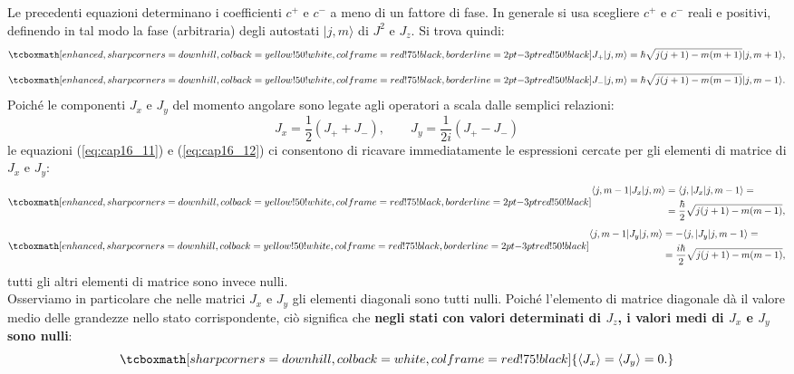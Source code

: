 \documentclass[a4paper,12pt,oneside]{book}
\begin{document}
Le precedenti equazioni determinano i coefficienti $c^+$ e $c^-$ a meno di un fattore di fase. In generale si usa scegliere $c^+$ e $c^-$ reali e positivi, definendo in tal modo la fase (arbitraria) degli autostati $\vert j,m \rangle$ di $J^2$ e $J_z$. Si trova quindi:
	\begin{equation}
		\tcboxmath[enhanced, sharp corners=downhill, colback=yellow!50!white, colframe=red!75!black, borderline={2pt}{-3pt}{red!50!black}]{
 			J_+\vert j, m \rangle =\hbar \sqrt{j(j+1)-m(m+1)}\vert j, m+1 \rangle ,
 			}
	\label{eq:cap16_11}
	\end{equation}
	\begin{equation}
		\tcboxmath[enhanced, sharp corners=downhill, colback=yellow!50!white, colframe=red!75!black, borderline={2pt}{-3pt}{red!50!black}]{
			J_-\vert j, m \rangle =\hbar \sqrt{j(j+1)-m(m-1)}\vert j, m-1 \rangle  .
			}
	\label{eq:cap16_12}
	\end{equation}
Poiché le componenti $J_x$ e $J_y$ del momento angolare sono legate agli operatori a scala dalle semplici relazioni:
\begin{equation}
J_x= \frac{1}{2}\left(J_+ + J_-\right),\qquad J_y= \frac{1}{2i}\left(J_+ - J_-\right)
\end{equation}
le equazioni (\ref{eq:cap16_11}) e (\ref{eq:cap16_12}) ci consentono di ricavare immediatamente le espressioni cercate per gli elementi di matrice di $J_x$ e $J_y$:
	\begin{equation}
		\tcboxmath[enhanced, sharp corners=downhill, colback=yellow!50!white, colframe=red!75!black, borderline={2pt}{-3pt}{red!50!black}]{
		\begin{aligned}
			\langle j, m-1\vert J_x\vert j, m \rangle &=\langle j, \vert J_x\vert j, m-1 \rangle =   \\
			&= \frac{\hbar}{2}\sqrt{j(j+1)-m(m-1)} , 
		\end{aligned}
		}
	\end{equation}
	\begin{equation}
		\tcboxmath[enhanced, sharp corners=downhill, colback=yellow!50!white, colframe=red!75!black, borderline={2pt}{-3pt}{red!50!black}]{
		\begin{aligned}
			\langle j, m-1\vert J_y\vert j, m \rangle &= -\langle j, \vert J_y\vert j, m-1 \rangle =  \\
			&= \frac{i\hbar}{2}\sqrt{j(j+1)-m(m-1)} , 
		\end{aligned}
		}
	\end{equation}
tutti gli altri elementi di matrice sono invece nulli.\\

Osserviamo in particolare che nelle matrici $J_x$ e $J_y$ gli elementi diagonali sono tutti nulli. Poiché l'elemento di matrice diagonale dà il valore medio delle grandezze nello stato corrispondente, ciò significa che \textbf{negli stati con valori determinati di $J_z$, i valori medi di $J_x$ e $J_y$ sono nulli}:
	\begin{equation}
		\tcboxmath[sharp corners=downhill, colback=white, colframe=red!75!black]{
			\langle J_x \rangle = \langle J_y \rangle =0.
		}
	\end{equation}
\end{document}
